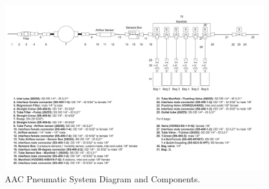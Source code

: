 

\newpage
\begin{landscape}
\begin{figure}[H]
    \centering
    \includegraphics[width=1.45\textwidth]{4-experiment-design/img/Mechanical/AAC_Subsystem.png}
    \caption{AAC Pneumatic System Diagram and Components.}
    \label{pneumatic_system}
\end{figure}
\end{landscape}

\raggedbottom